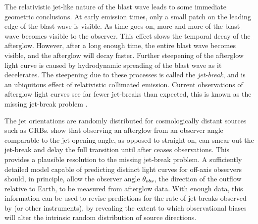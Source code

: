 The relativistic jet-like nature of the blast wave leads to some immediate geometric conclusions.  At early emission times, only a small patch on the leading edge of the blast wave is visible.  As time goes on, more and more of the blast wave becomes visible to the observer.  This effect slows the temporal decay of the afterglow.  However, after a long enough time, the entire blast wave becomes visible, and the afterglow will decay faster.  Further steepening of the afterglow light curve is caused by hydrodynamic spreading of the blast wave as it decelerates.  The steepening due to these processes is called the \emph{jet-break}, and is an ubiquitous effect of relativistic collimated emission.  Current observations of afterglow light curves see far fewer jet-breaks than expected, this is known as the missing jet-break problem \citep{Sato07,Liang08, Kocevski08, Racusin09}.

The jet orientations are randomly distributed for cosmologically distant sources such as GRBs. \citet{vanEer10offaxis, vanEer11} show that observing an afterglow from an observer angle comparable to the jet opening angle, as opposed to straight-on, can smear out the jet-break and delay the full transition until after \swift{} ceases observations. This provides a plausible resolution to the missing jet-break problem.  A sufficiently detailed model capable of predicting distinct light curves for off-axis observers should, in principle, allow the observer angle $\theta_{obs}$, the direction of the outflow relative to Earth, to be measured from afterglow data. With enough data, this information can be used to revise predictions for the rate of jet-breaks observed by \swift{} (or other instruments), by revealing the extent to which observational biases will alter the intrinsic random distribution of source directions.

